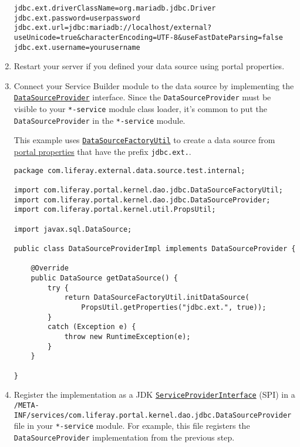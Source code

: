 \begin{enumerate}
\begin{verbatim}
jdbc.ext.driverClassName=org.mariadb.jdbc.Driver
jdbc.ext.password=userpassword
jdbc.ext.url=jdbc:mariadb://localhost/external?useUnicode=true&characterEncoding=UTF-8&useFastDateParsing=false
jdbc.ext.username=yourusername
\end{verbatim}
\item
  Restart your server if you defined your data source using portal
  properties.
\item
  Connect your Service Builder module to the data source by implementing
  the
  \href{https://docs.liferay.com/dxp/portal/7.2-latest/javadocs/portal-kernel/com/liferay/portal/kernel/dao/jdbc/DataSourceProvider.html}{\texttt{DataSourceProvider}}
  interface. Since the \texttt{DataSourceProvider} must be visible to
  your \texttt{*-service} module class loader, it's common to put the
  \texttt{DataSourceProvider} in the \texttt{*-service} module.

  This example uses
  \href{https://docs.liferay.com/dxp/portal/7.2-latest/javadocs/portal-kernel/com/liferay/portal/kernel/dao/jdbc/DataSourceFactoryUtil.html}{\texttt{DataSourceFactoryUtil}}
  to create a data source from
  \href{/docs/7-2/deploy/-/knowledge_base/d/portal-properties}{portal
  properties} that have the prefix \texttt{jdbc.ext.}.

\begin{verbatim}
package com.liferay.external.data.source.test.internal;

import com.liferay.portal.kernel.dao.jdbc.DataSourceFactoryUtil;
import com.liferay.portal.kernel.dao.jdbc.DataSourceProvider;
import com.liferay.portal.kernel.util.PropsUtil;

import javax.sql.DataSource;

public class DataSourceProviderImpl implements DataSourceProvider {

    @Override
    public DataSource getDataSource() {
        try {
            return DataSourceFactoryUtil.initDataSource(
                PropsUtil.getProperties("jdbc.ext.", true));
        }
        catch (Exception e) {
            throw new RuntimeException(e);
        }
    }

}
\end{verbatim}
\item
  Register the implementation as a JDK
  \href{https://docs.oracle.com/javase/tutorial/sound/SPI-intro.html}{\texttt{ServiceProviderInterface}}
  (SPI) in a
  \texttt{/META-INF/services/com.liferay.portal.kernel.dao.jdbc.DataSourceProvider}
  file in your \texttt{*-service} module. For example, this file
  registers the \texttt{DataSourceProvider} implementation from the
  previous step.


\end{enumerate}
